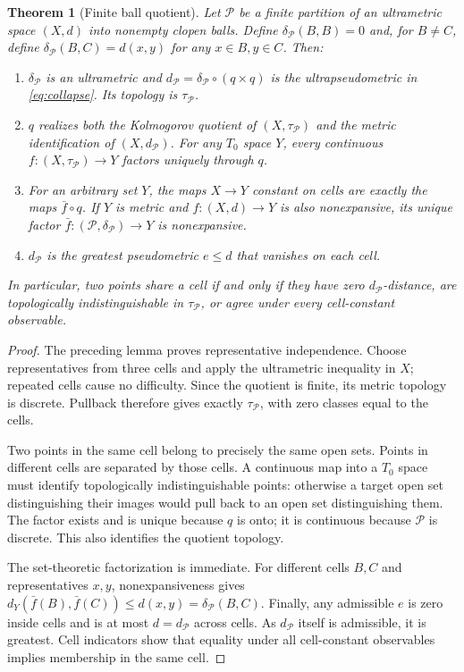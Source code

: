 \documentclass[11pt]{article}
\newtheorem{theorem}{Theorem}[section]
\theoremstyle{definition}
\theoremstyle{remark}
\newcommand{\PP}{\mathcal P}
\begin{document}
\begin{theorem}[Finite ball quotient]\label{thm:quotient}
Let $\PP$ be a finite partition of an ultrametric space $(X,d)$ into nonempty clopen balls. Define $\delta_{\PP}(B,B)=0$ and, for $B\ne C$, define $\delta_{\PP}(B,C)=d(x,y)$ for any $x\in B,y\in C$. Then:
\begin{enumerate}[label=(\roman*)]
\item $\delta_{\PP}$ is an ultrametric and $d_{\PP}=\delta_{\PP}\circ(q\times q)$ is the ultrapseudometric in \eqref{eq:collapse}. Its topology is $\tau_{\PP}$.
\item $q$ realizes both the Kolmogorov quotient of $(X,\tau_{\PP})$ and the metric identification of $(X,d_{\PP})$. For any $T_0$ space $Y$, every continuous $f:(X,\tau_{\PP})\to Y$ factors uniquely through $q$.
\item For an arbitrary set $Y$, the maps $X\to Y$ constant on cells are exactly the maps $\bar f\circ q$. If $Y$ is metric and $f:(X,d)\to Y$ is also nonexpansive, its unique factor $\bar f:(\PP,\delta_{\PP})\to Y$ is nonexpansive.
\item $d_{\PP}$ is the greatest pseudometric $e\leq d$ that vanishes on each cell.
\end{enumerate}
In particular, two points share a cell if and only if they have zero $d_{\PP}$-distance, are topologically indistinguishable in $\tau_{\PP}$, or agree under every cell-constant observable.
\end{theorem}
\begin{proof}
The preceding lemma proves representative independence. Choose representatives from three cells and apply the ultrametric inequality in $X$; repeated cells cause no difficulty. Since the quotient is finite, its metric topology is discrete. Pullback therefore gives exactly $\tau_{\PP}$, with zero classes equal to the cells.

Two points in the same cell belong to precisely the same open sets. Points in different cells are separated by those cells. A continuous map into a $T_0$ space must identify topologically indistinguishable points: otherwise a target open set distinguishing their images would pull back to an open set distinguishing them. The factor exists and is unique because $q$ is onto; it is continuous because $\PP$ is discrete. This also identifies the quotient topology.

The set-theoretic factorization is immediate. For different cells $B,C$ and representatives $x,y$, nonexpansiveness gives
$d_Y(\bar f(B),\bar f(C))\leq d(x,y)=\delta_{\PP}(B,C)$.
Finally, any admissible $e$ is zero inside cells and is at most $d=d_{\PP}$ across cells. As $d_{\PP}$ itself is admissible, it is greatest. Cell indicators show that equality under all cell-constant observables implies membership in the same cell.
\end{proof}
\end{document}
